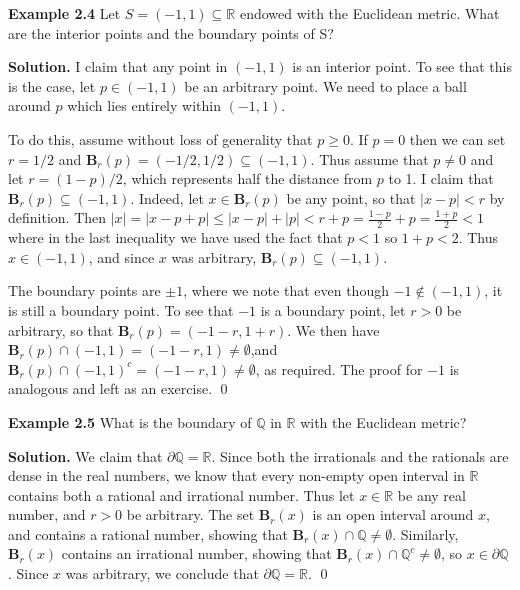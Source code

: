 \documentclass{article}
\theoremstyle{definition}
\numberwithin{equation}{section}
\begin{document}
\begin{myexamplebox}
\textbf{Example 2.4}
Let \( S = (-1,1) \subseteq \mathbb{R} \) endowed with the Euclidean metric. What are the interior points and the boundary points of S?
\end{myexamplebox}

\textbf{Solution.} I claim that any point in \((-1,1)\) is an interior point. To see that this is the case, let \( p \in (-1,1) \) be an arbitrary point. We need to place a ball around \( p \) which lies entirely within \((-1, 1)\).

\medskip

To do this, assume without loss of generality that \( p \geq 0 \). If \( p = 0 \) then we can set \( r = 1/2 \) and \( \mathbf{B}_{r}(p) = (-1/2, 1/2) \subseteq (-1, 1) \). Thus assume that \( p \neq 0 \) and let \( r = (1-p)/2 \), which represents half the distance from \( p \) to 1. I claim that \( \mathbf{B}_{r}(p) \subseteq (-1,1) \). Indeed, let \( x \in \mathbf{B}_{r}(p) \) be any point, so that \( | x - p | < r \) by definition. Then
$
| x | = | x - p + p | \leq | x - p | + | p | < r + p = \frac{1 - p}{2} + p = \frac{1 + p}{2} < 1
$
where in the last inequality we have used the fact that \( p < 1 \) so \( 1 + p < 2 \). Thus \( x \in (-1,1) \), and since \( x \) was arbitrary, \( \mathbf{B}_{r}(p) \subseteq (-1,1) \).

The boundary points are \(\pm 1\), where we note that even though \( -1 \notin (-1,1) \), it is still a boundary point. To see that \(-1 \) is a boundary point, let \( r > 0 \) be arbitrary, so that \( \mathbf{B}_{r}(p) = ( -1 - r, 1 + r) \). We then have \( \mathbf{B}_{r}(p) \cap (-1,1) = ( -1 - r, 1) \neq \emptyset \),and \( \mathbf{B}_{r}(p) \cap (-1, 1)^{c} = ( -1 - r, 1) \neq \emptyset \), as required. The proof for \( -1 \) is analogous and left as an exercise.
\qed

\begin{myexamplebox}
\textbf{Example 2.5}
What is the boundary of \(\mathbb{Q}\) in \(\mathbb{R}\) with the Euclidean metric?
\end{myexamplebox}

\textbf{Solution.} We claim that \(\partial \mathbb{Q} = \mathbb{R} \). Since both the irrationals and the rationals are dense in the real numbers, we know that every non-empty open interval in \(\mathbb{R}\) contains both a rational and irrational number. Thus let \( x \in \mathbb{R} \) be any real number, and \( r > 0 \) be arbitrary. The set \( \mathbf{B}_{r}(x) \) is an open interval around \( x \), and contains a rational number, showing that \( \mathbf{B}_{r}(x) \cap \mathbb{Q} \neq \emptyset \). Similarly, \( \mathbf{B}_{r}(x) \) contains an irrational number, showing that \( \mathbf{B}_{r}(x) \cap \mathbb{Q}^{c} \neq \emptyset \), so \( x \in \partial \mathbb{Q} \). Since \( x \) was arbitrary, we conclude that \( \partial \mathbb{Q} = \mathbb{R} \).
\qed
\end{document}
